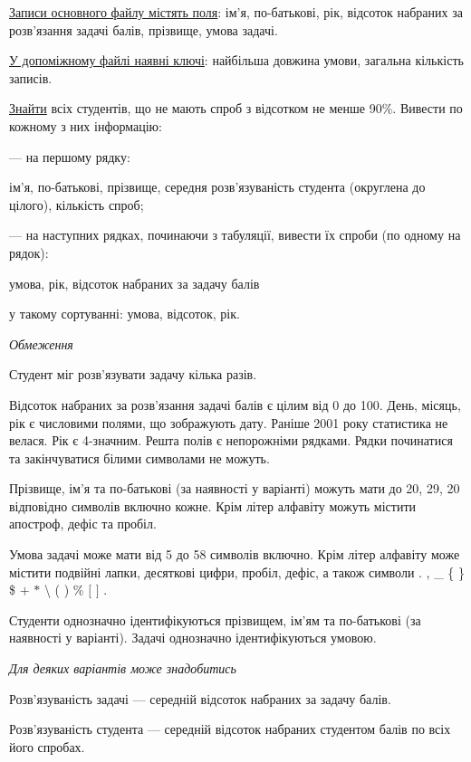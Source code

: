 \documentclass[11pt, ukrainian]{article}
\begin{document}
\underline{Записи основного файлу містять поля}: ім’я, по-батькові, рік, відсоток набраних за розв’язання задачі балів, прізвище, умова задачі.

\underline{У допоміжному файлі наявні ключі}: найбільша довжина умови, загальна кількість записів.

\underline{Знайти} всіх студентів, що не мають спроб з відсотком не менше 90\%. Вивести по кожному з них інформацію:\par
{\noindent}--- на першому рядку:\par
ім’я, по-батькові, прізвище, середня розв’язуваність студента (округлена до цілого), кількість спроб;

{\noindent}--- на наступних рядках, починаючи з табуляції, вивести їх спроби (по одному на рядок):\par
умова, рік, відсоток набраних за задачу балів

{\noindent}у такому сортуванні: умова, відсоток, рік.


\bigskip\textit{Обмеження}

Студент міг розв’язувати задачу кілька разів.

Відсоток набраних за розв’язання задачі балів є цілим від 0 до 100.
День, місяць, рік є числовими полями, що зображують дату.
Раніше 2001 року статистика не велася. Рік є 4-значним.
Решта полів є непорожніми рядками.
Рядки починатися та закінчуватися білими символами не можуть.

Прізвище, ім’я та по-батькові (за наявності у варіанті) можуть мати до 20, 29, 20 відповідно символів включно кожне. 
Крім літер алфавіту можуть містити апостроф, дефіс та пробіл.

Умова задачі може мати від 5 до 58 символів включно.
Крім літер алфавіту може містити подвійні лапки, десяткові цифри, пробіл, дефіс,
а також символи . , \_ \{ \} \$ $+$ $*$ {\textbackslash} ( ) \% $[$ $]$ .

Студенти однозначно ідентифікуються прізвищем, ім’ям та по-батькові (за наявності у варіанті).
Задачі однозначно ідентифікуються умовою.

\bigskip\textit{Для деяких варіантів може знадобитись}

Розв'язуваність задачі --- середній відсоток набраних за задачу балів.

Розв'язуваність студента --- середній відсоток набраних студентом балів по всіх його спробах.
\end{document}

